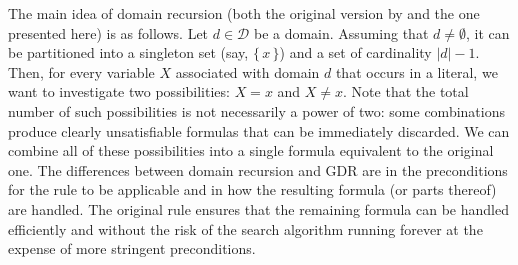 
The main idea of domain recursion (both the original version by \citet{DBLP:conf/nips/Broeck11} and the one presented here) is as follows. Let $d \in \mathcal{D}$ be a domain. Assuming that $d \ne \emptyset$, it can be partitioned into a singleton set (say, $\{\, x \,\}$) and a set of cardinality $|d| - 1$. Then, for every variable $X$ associated with domain $d$ that occurs in a literal, we want to investigate two possibilities: $X = x$ and $X \ne x$. Note that the total number of such possibilities is not necessarily a power of two: some combinations produce clearly unsatisfiable formulas that can be immediately discarded. We can combine all of these possibilities into a single formula equivalent to the original one. The differences between domain recursion and GDR are in the preconditions for the rule to be applicable and in how the resulting formula (or parts thereof) are handled. The original rule ensures that the remaining formula can be handled efficiently and without the risk of the search algorithm running forever at the expense of more stringent preconditions.

